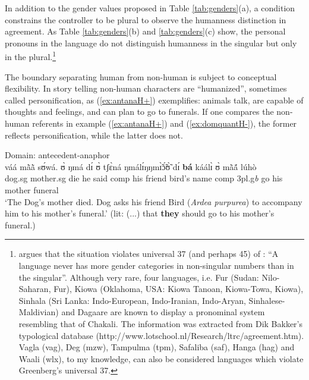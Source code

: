 \begin{exe}
\begin{exe}
\begin{exe}
{\begin{exe}
\begin{exe}
\begin{exe}
\begin{exe}
\begin{exe}
\begin{exe}
\begin{exe}
\begin{xlist}
\begin{exe}
\begin{exe}
\begin{exe}
\begin{exe}
\begin{exe}
\begin{exe}
\begin{exe}
\begin{exe}
\begin{exe}
\begin{exe}
\begin{exe}
\begin{exe}
\begin{table}[htb!]
\end{table}



  In addition to
the gender values proposed in Table \ref{tab:genders}(a),  a condition
constrains
the controller to be plural to observe the humanness distinction in
agreement. As Table  \ref{tab:genders}(b)  and   \ref{tab:genders}(c) show, 
the personal pronouns in the language do not distinguish humanness in
 the singular but only in the plural.\footnote{\citet{Brin07c}  argues
that the situation  violates universal
  37 (and perhaps 45) of \citet{Gree63}: ``A language never has more
  gender categories in non-singular numbers than in the singular''.
  Although very rare, four languages, i.e. Fur (Sudan:  Nilo-Saharan, Fur), 
Kiowa (Oklahoma, USA: Kiowa Tanoan, Kiowa-Towa, Kiowa),  Sinhala (Sri
Lanka: Indo-European, Indo-Iranian,
  Indo-Aryan, Sinhalese-Maldivian) and Dagaare are known to display a pronominal
system resembling that of Chakali. The
information was extracted from Dik Bakker's typological database
(http://www.lotschool.nl/Research/ltrc/agreement.htm).  Vagla (vag),
Deg (mzw), Tampulma (tpm), Safaliba (saf), Hanga (hag) and Waali (wlx), to my
knowledge, can also be considered languages which violate Greenberg's
universal 37.} 

The boundary separating human from non-human is subject to conceptual
flexibility. In story telling non-human characters are ``humanized'', sometimes
called personification, as (\ref{ex:antanaH+}) exemplifies: animals talk, are
capable of thoughts and feelings, and can plan to go to funerals. If one
compares the non-human referents in example (\ref{ex:antanaH+}) and
(\ref{ex:domquantH-}), the former reflects personification, while the latter
does
not.


\begin{exe}
  \ex\label{ex:antanaH+}{\rm Domain: antecedent-anaphor}\\
\gll   váá  mã̀ã̀  sʊ́wá.   ʊ̀   ŋmá   dɪ́   ʊ̀  tʃɛ̀ná  
ŋmálɪ́ŋŋmɪ̃̀ɔ̃́ʊ̃̀   dɪ́   
\textbf{bá}  káálɪ̀  ʊ̀ mã̀ã́     lúhò \\
       {dog.{\sc sg}} {mother.{\sc sg}} {die} {he} {said} {\sc comp} {his}
{friend} {bird's name} {\sc comp} {{\sc 3pl.g}{\it b}} {go} {his}
{mother} {funeral} \\
\glt `The Dog's mother died. Dog asks his friend Bird ({\it Ardea purpurea}) to 
accompany him to his
mother's funeral.'  (lit: (...) that \textbf{they} should go to his mother's
funeral.) 
\z






\end{exe}
\end{exe}
\end{exe}
\end{exe}
\end{exe}
\end{exe}
\end{exe}
\end{exe}
\end{exe}
\end{exe}
\end{exe}
\end{exe}
\end{exe}
\end{xlist}
\end{exe}
\end{exe}
\end{exe}
\end{exe}
\end{exe}
\end{exe}
\end{exe}}
\end{exe}
\end{exe}
\end{exe}
